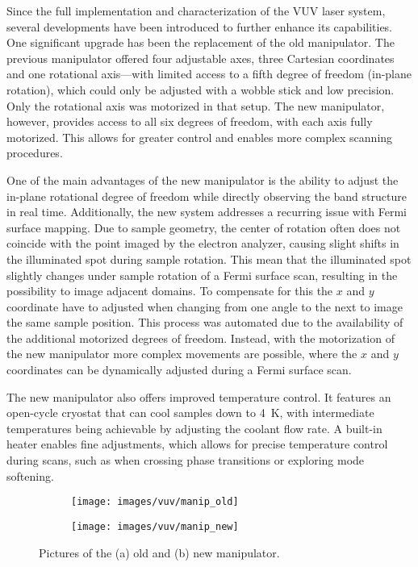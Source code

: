 Since the full implementation and characterization of the VUV laser system, several developments have been introduced to further enhance its capabilities.
One significant upgrade has been the replacement of the old manipulator.
The previous manipulator offered four adjustable axes, three Cartesian coordinates and one rotational axis—with limited access to a fifth degree of freedom (in-plane rotation), which could only be adjusted with a wobble stick and low precision.
Only the rotational axis was motorized in that setup.
The new manipulator, however, provides access to all six degrees of freedom, with each axis fully motorized.
This allows for greater control and enables more complex scanning procedures.

One of the main advantages of the new manipulator is the ability to adjust the in-plane rotational degree of freedom while directly observing the band structure in real time.
Additionally, the new system addresses a recurring issue with Fermi surface mapping.
Due to sample geometry, the center of rotation often does not coincide with the point imaged by the electron analyzer, causing slight shifts in the illuminated spot during sample rotation.
This mean that the illuminated spot slightly changes under sample rotation of a Fermi surface scan, resulting in the possibility to image adjacent domains.
To compensate for this the $x$ and $y$ coordinate have to adjusted when changing from one angle to the next to image the same sample position.
This process was automated due to the availability of the additional motorized degrees of freedom.
Instead, with the motorization of the new manipulator more complex movements are possible, where the $x$ and $y$ coordinates can be dynamically adjusted during a Fermi surface scan.

The new manipulator also offers improved temperature control.
It features an open-cycle cryostat that can cool samples down to \qty{4}{\kelvin}, with intermediate temperatures being achievable by adjusting the coolant flow rate.
A built-in heater enables fine adjustments, which allows for precise temperature control during scans, such as when crossing phase transitions or exploring mode softening.

\begin{figure}[h]
	\centering
	\begin{subfigure}[b]{0.46\textwidth}
		\texttt{[image: images/vuv/manip\_old]}
		\caption{}
	\end{subfigure}
	\begin{subfigure}[b]{0.46\textwidth}
		\texttt{[image: images/vuv/manip\_new]}
		\caption{}
	\end{subfigure}
	\caption{Pictures of the (a) old and (b) new manipulator.}
	\label{fig:manip_full}
\end{figure}

